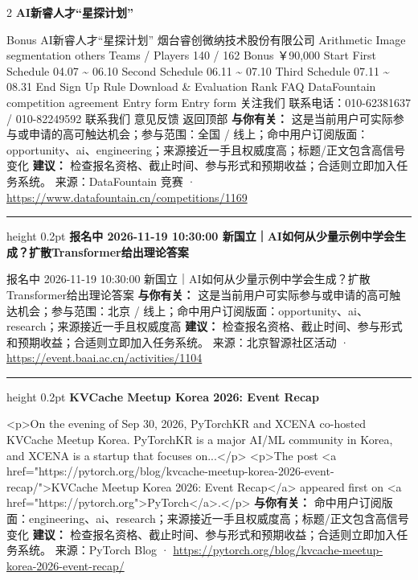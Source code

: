 \documentclass[10.5pt]{ctexart}
\begin{document}
\begin{multicols}{2}
{\large\bfseries AI新睿人才“星探计划”}\par
Bonus AI新睿人才“星探计划” 烟台睿创微纳技术股份有限公司 Arithmetic Image segmentation others Teams / Players 140 / 162 Bonus ￥90,000 Start First Schedule 04.07 \textasciitilde{} 06.10 Second Schedule 06.11 \textasciitilde{} 07.10 Third Schedule 07.11 \textasciitilde{} 08.31 End Sign Up Rule Download \& Evaluation Rank FAQ DataFountain competition agreement Entry form Entry form 关注我们 联系电话：010-62381637 / 010-82249592 联系我们 意见反馈 返回顶部
\textbf{与你有关：} 这是当前用户可实际参与或申请的高可触达机会；参与范围：全国 / 线上；命中用户订阅版面：opportunity、ai、engineering；来源接近一手且权威度高；标题/正文包含高信号变化
\textbf{建议：} 检查报名资格、截止时间、参与形式和预期收益；合适则立即加入任务系统。
{\footnotesize\color{ormuted} 来源：DataFountain 竞赛 · \url{https://www.datafountain.cn/competitions/1169}}
\vspace{2mm}
\hrule height 0.2pt
\vspace{2mm}
{\large\bfseries 报名中 2026-11-19 10:30:00 新国立｜AI如何从少量示例中学会生成？扩散Transformer给出理论答案}\par
报名中 2026-11-19 10:30:00 新国立｜AI如何从少量示例中学会生成？扩散Transformer给出理论答案
\textbf{与你有关：} 这是当前用户可实际参与或申请的高可触达机会；参与范围：北京 / 线上；命中用户订阅版面：opportunity、ai、research；来源接近一手且权威度高
\textbf{建议：} 检查报名资格、截止时间、参与形式和预期收益；合适则立即加入任务系统。
{\footnotesize\color{ormuted} 来源：北京智源社区活动 · \url{https://event.baai.ac.cn/activities/1104}}
\vspace{2mm}
\hrule height 0.2pt
\vspace{2mm}
{\large\bfseries KVCache Meetup Korea 2026: Event Recap}\par
<p>On the evening of Sep 30, 2026, PyTorchKR and XCENA co-hosted KVCache Meetup Korea. PyTorchKR is a major AI/ML community in Korea, and XCENA is a startup that focuses on...</p> <p>The post <a href="https://pytorch.org/blog/kvcache-meetup-korea-2026-event-recap/">KVCache Meetup Korea 2026: Event Recap</a> appeared first on <a href="https://pytorch.org">PyTorch</a>.</p>
\textbf{与你有关：} 命中用户订阅版面：engineering、ai、research；来源接近一手且权威度高；标题/正文包含高信号变化
\textbf{建议：} 检查报名资格、截止时间、参与形式和预期收益；合适则立即加入任务系统。
{\footnotesize\color{ormuted} 来源：PyTorch Blog · \url{https://pytorch.org/blog/kvcache-meetup-korea-2026-event-recap/}}

\end{multicols}
\end{document}
